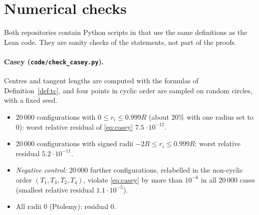 \documentclass[11pt]{article}
\theoremstyle{definition}
\theoremstyle{remark}
\begin{document}
\section{Numerical checks}\label{sec:numerics}

Both repositories contain Python scripts in  that use the same definitions as the Lean
code. They are sanity checks of the statements, not part of the proofs.

\paragraph{Casey (\texttt{code/check\_casey.py}).}
Centres and tangent lengths are computed with the formulas of Definition~\ref{def:tc}, and four
points in cyclic order are sampled on random circles, with a fixed seed.
\begin{itemize}
\item 20\,000 configurations with $0\le r_i\le0.999R$ (about 20\% with one radius set to $0$): worst relative residual
of \eqref{eq:casey} $7.5\cdot10^{-12}$.
\item 20\,000 configurations with signed radii $-2R\le r_i\le0.999R$: worst relative residual $5.2\cdot10^{-11}$.
\item \emph{Negative control:} 20\,000 further configurations, relabelled in the non-cyclic order $(T_1,T_3,T_2,T_4)$,
violate \eqref{eq:casey} by more than $10^{-6}$ in all 20\,000 cases (smallest relative
residual $1.1\cdot10^{-5}$).
\item All radii $0$ (Ptolemy): residual $0$.
\end{itemize}
\end{document}
